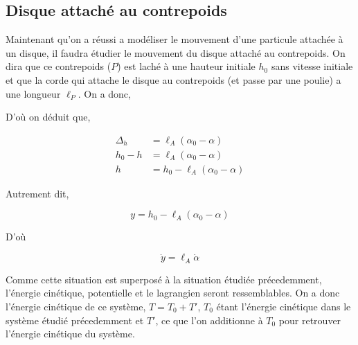 \documentclass[10pt]{article}
\begin{document}
\pagebreak

\subsection{Disque attaché au contrepoids}

Maintenant qu'on a réussi a modéliser le mouvement d'une particule attachée à un disque, il faudra étudier le mouvement du disque
attaché au contrepoids. On dira que ce contrepoids ($P$) est laché à une hauteur initiale $h_0$ sans vitesse initiale et que la corde
qui attache le disque au contrepoids (et passe par une poulie) a une longueur $\ell_{P}$. On a donc,
\begin{center}
\end{center}

D'où on déduit que,

\begin{align*}
 \Delta_h &= \ell_A(\alpha_0-\alpha) \\
 h_0 - h &= \ell_A(\alpha_0-\alpha) \\
 h &= h_0 - \ell_A(\alpha_0-\alpha)
\end{align*}

Autrement dit,

\begin{equation}
 y = h_0 - \ell_A(\alpha_0-\alpha)
\end{equation}

D'où

$$ \dot{y} = \ell_A\dot{\alpha}$$

Comme cette situation est superposé à la situation étudiée précedemment, l'énergie cinétique, potentielle et le lagrangien seront
ressemblables. On a donc l'énergie cinétique de ce système, $T = T_0 + T'$, $T_0$ étant l'énergie cinétique dans le système étudié
précedemment et $T'$, ce que l'on additionne à $T_0$ pour retrouver l'énergie cinétique du système.
\end{document}
